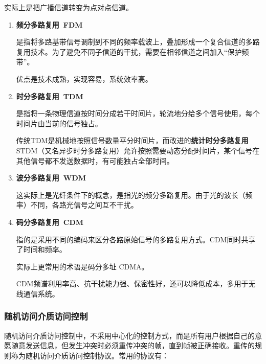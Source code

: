 \documentclass[12pt, a4paper, oneside]{ctexart}
\begin{document}
实际上是把广播信道转变为点对点信道。

\begin{enumerate}
    \item {\bf 频分多路复用\ FDM}
    
    是指将多路基带信号调制到不同的频率载波上，叠加形成一个复合信道的多路复用技术。为了避免不同子信道的干扰，需要在相邻信道之间加入“保护频带”。

    优点是技术成熟，实现容易，系统效率高。
    \item {\bf 时分多路复用\ TDM}
    
    是指将一条物理信道按时间分成若干时间片，轮流地分给多个信号使用，每个时间片由当前的信号独占。

    传统TDM是机械地按照信号数量平分时间片，而改进的\textbf{统计时分多路复用}STDM（又名异步时分多路复用）允许按照需要动态分配时间片，某个信号在其他信号都不发送数据时，有可能独占全部时间。
    \item {\bf 波分多路复用\ WDM}
    
    这实际上是光纤条件下的概念，是指光的频分多路复用。由于光的波长（频率）不同，各路光信号之间互不干扰。
    \item {\bf 码分多路复用\ CDM}
    
    指的是采用不同的编码来区分各路原始信号的多路复用方式。CDM同时共享了时间和频率。

    实际上更常用的术语是码分多址 CDMA。

    CDM频谱利用率高、抗干扰能力强、保密性好，还可以降低成本，多用于无线通信系统。
\end{enumerate}

\subsubsection{随机访问介质访问控制}

随机访问介质访问控制中，不采用中心化的控制方式，而是所有用户根据自己的意愿随意发送信息，但发生冲突时必须重传冲突的帧，直到帧被正确接收。重传的规则称为随机访问介质访问控制协议。常用的协议有：
\end{document}
